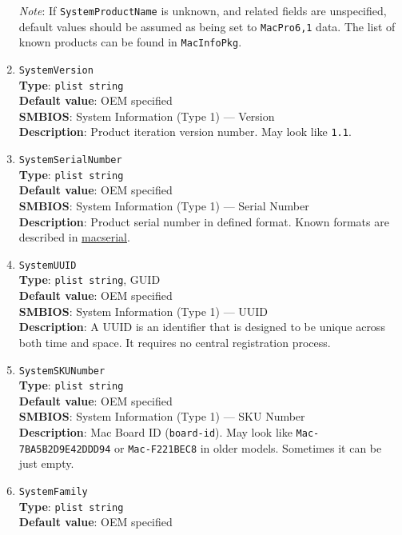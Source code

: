\documentclass[]{article}
\begin{document}
\begin{enumerate}
  \emph{Note}: If \texttt{SystemProductName} is unknown, and related
  fields are unspecified, default values should be assumed as being set
  to \texttt{MacPro6,1} data. The list of known products can be found in
  \texttt{MacInfoPkg}.
\item
  \texttt{SystemVersion}\\
  \textbf{Type}: \texttt{plist\ string}\\
  \textbf{Default value}: OEM specified\\
  \textbf{SMBIOS}: System Information (Type 1) --- Version\\
  \textbf{Description}: Product iteration version number. May look like
  \texttt{1.1}.
\item
  \texttt{SystemSerialNumber}\\
  \textbf{Type}: \texttt{plist\ string}\\
  \textbf{Default value}: OEM specified\\
  \textbf{SMBIOS}: System Information (Type 1) --- Serial Number\\
  \textbf{Description}: Product serial number in defined format. Known
  formats are described in
  \href{https://github.com/acidanthera/macserial/blob/master/FORMAT.md}{macserial}.
\item
  \texttt{SystemUUID}\\
  \textbf{Type}: \texttt{plist\ string}, GUID\\
  \textbf{Default value}: OEM specified\\
  \textbf{SMBIOS}: System Information (Type 1) --- UUID\\
  \textbf{Description}: A UUID is an identifier that is designed to be
  unique across both time and space. It requires no central registration
  process.
\item
  \texttt{SystemSKUNumber}\\
  \textbf{Type}: \texttt{plist\ string}\\
  \textbf{Default value}: OEM specified\\
  \textbf{SMBIOS}: System Information (Type 1) --- SKU Number\\
  \textbf{Description}: Mac Board ID (\texttt{board-id}). May look like
  \texttt{Mac-7BA5B2D9E42DDD94} or \texttt{Mac-F221BEC8} in older
  models. Sometimes it can be just empty.
\item
  \texttt{SystemFamily}\\
  \textbf{Type}: \texttt{plist\ string}\\
  \textbf{Default value}: OEM specified\\

\end{enumerate}
\end{document}
